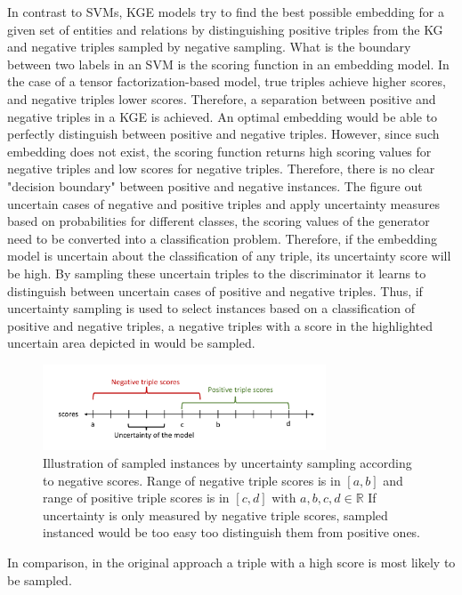 In contrast to \acp{SVM}, \ac{KGE} models try to find the best possible embedding for a given set of entities and relations by distinguishing positive triples from the \ac{KG} and negative triples sampled by negative sampling.
What is the boundary between two labels in an \ac{SVM} is the scoring function in an embedding model.
In the case of a tensor factorization-based model, true triples achieve higher scores, and negative triples lower scores.
Therefore, a separation between positive and negative triples in a \ac{KGE} is achieved.
An optimal embedding would be able to perfectly distinguish between positive and negative triples.
However, since such embedding does not exist, the scoring function returns high scoring values for negative triples and low scores for negative triples.
Therefore, there is no clear "decision boundary" between positive and negative instances.
The figure out uncertain cases of negative and positive triples and apply uncertainty measures based on probabilities for different classes, the scoring values of the generator need to be converted into a classification problem.
Therefore, if the embedding model is uncertain about the classification of any triple, its uncertainty score will be high.
By sampling these uncertain triples to the discriminator it learns to distinguish between uncertain cases of positive and negative triples.
Thus, if uncertainty sampling is used to select instances based on a classification of positive and negative triples, a negative triples with a score in the highlighted uncertain area depicted in  would be sampled.
\begin{figure}[t]
  \centering
    \includegraphics[width=0.75\textwidth]{figures/badVsGoodApproach.pdf}
  \caption{Illustration of sampled instances by uncertainty sampling according to negative scores.
  Range of negative triple scores is in $[a, b]$ and range of positive triple scores is in  $[c, d]$ with $a,b,c,d \in \mathbb{R}$
  If uncertainty is only measured by negative triple scores, sampled instanced would be too easy too distinguish them from positive ones.}
  \label{fig:badVsGoodApproach}
\end{figure}
In comparison, in the original \kbgan approach a triple with a high score is most likely to be sampled.

